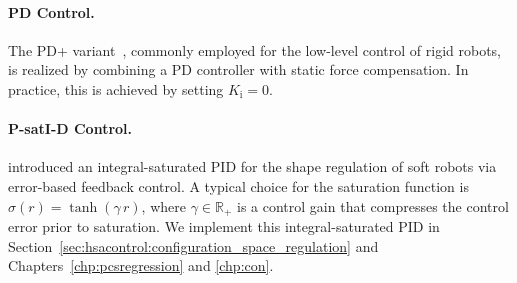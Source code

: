 \paragraph{PD Control.} The PD+ variant~\citep{kelly1997pd}, commonly employed for the low-level control of rigid robots, is realized by combining a PD controller with static force compensation. In practice, this is achieved by setting $K_\mathrm{i} = 0$.

\paragraph{P-satI-D Control.} \citet{pustina2022p} introduced an integral-saturated PID for the shape regulation of soft robots via error-based feedback control. A typical choice for the saturation function is $\sigma(r) = \tanh(\gamma \, r)$, where $\gamma \in \mathbb{R}_+$ is a control gain that compresses the control error prior to saturation. We implement this integral-saturated PID in Section~\ref{sec:hsacontrol:configuration_space_regulation} and Chapters~\ref{chp:pcsregression} and \ref{chp:con}.

